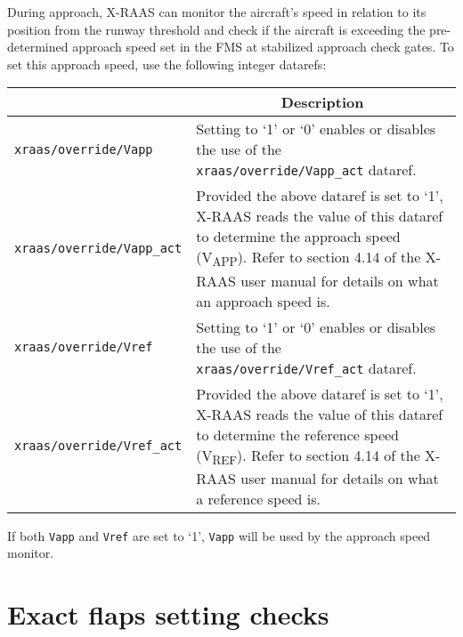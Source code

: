 \documentclass[a4paper,12pt]{article}
\newcommand{\dataref}[1]{\texttt{#1}}
\begin{document}
During approach, X-RAAS can monitor the aircraft's speed in relation to
its position from the runway threshold and check if the aircraft is
exceeding the pre-determined approach speed set in the FMS at stabilized
approach check gates. To set this approach speed, use the following
integer datarefs:

{\small
\begin{center}

\begin{tabular}{|p{}|p{}|}

\hline

\rowcolor{tablehdrcolor}
\multicolumn{1}{|c}{\textbf{Name}} &
\multicolumn{1}{|c|}{\textbf{Description}} \\

\hline

\dataref{xraas/override/Vapp} &
Setting to `1' or `0' enables or disables the use of the
\dataref{xraas/override/Vapp\_act} dataref. \\

\hline

\dataref{xraas/override/Vapp\_act} &
Provided the above dataref is set to `1', X-RAAS reads the value of this
dataref to determine the approach speed (V\textsubscript{APP}). Refer to
section 4.14 of the X-RAAS user manual for details on what an approach
speed is. \\

\hline

\dataref{xraas/override/Vref} &
Setting to `1' or `0' enables or disables the use of the
\dataref{xraas/override/Vref\_act} dataref. \\

\hline

\dataref{xraas/override/Vref\_act} &
Provided the above dataref is set to `1', X-RAAS reads the value of this
dataref to determine the reference speed (V\textsubscript{REF}). Refer to
section 4.14 of the X-RAAS user manual for details on what a reference
speed is. \\

\hline

\end{tabular}
\end{center}
} %

\noindent If both \dataref{Vapp} and \dataref{Vref} are set to `1',
\dataref{Vapp} will be used by the approach speed monitor.

\section{Exact flaps setting checks}
\end{document}
